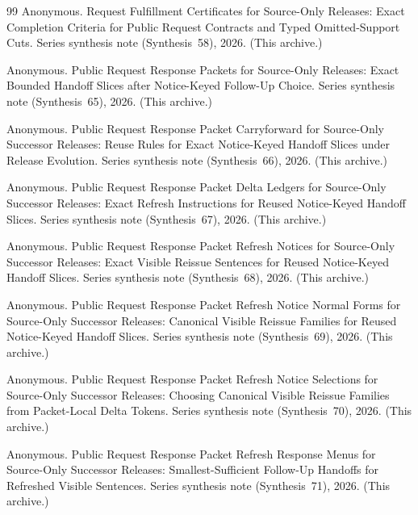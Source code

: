 \documentclass[11pt]{article}
\begin{document}
\begin{thebibliography}{99}
Anonymous.
\newblock Request Fulfillment Certificates for Source-Only Releases: Exact Completion Criteria for Public Request Contracts and Typed Omitted-Support Cuts.
\newblock Series synthesis note (Synthesis~58), 2026. (This archive.)



Anonymous.
\newblock Public Request Response Packets for Source-Only Releases: Exact Bounded Handoff Slices after Notice-Keyed Follow-Up Choice.
\newblock Series synthesis note (Synthesis~65), 2026. (This archive.)

Anonymous.
\newblock Public Request Response Packet Carryforward for Source-Only Successor Releases: Reuse Rules for Exact Notice-Keyed Handoff Slices under Release Evolution.
\newblock Series synthesis note (Synthesis~66), 2026. (This archive.)

Anonymous.
\newblock Public Request Response Packet Delta Ledgers for Source-Only Successor Releases: Exact Refresh Instructions for Reused Notice-Keyed Handoff Slices.
\newblock Series synthesis note (Synthesis~67), 2026. (This archive.)

Anonymous.
\newblock Public Request Response Packet Refresh Notices for Source-Only Successor Releases: Exact Visible Reissue Sentences for Reused Notice-Keyed Handoff Slices.
\newblock Series synthesis note (Synthesis~68), 2026. (This archive.)

Anonymous.
\newblock Public Request Response Packet Refresh Notice Normal Forms for Source-Only Successor Releases: Canonical Visible Reissue Families for Reused Notice-Keyed Handoff Slices.
\newblock Series synthesis note (Synthesis~69), 2026. (This archive.)

Anonymous.
\newblock Public Request Response Packet Refresh Notice Selections for Source-Only Successor Releases: Choosing Canonical Visible Reissue Families from Packet-Local Delta Tokens.
\newblock Series synthesis note (Synthesis~70), 2026. (This archive.)

Anonymous.
\newblock Public Request Response Packet Refresh Response Menus for Source-Only Successor Releases: Smallest-Sufficient Follow-Up Handoffs for Refreshed Visible Sentences.
\newblock Series synthesis note (Synthesis~71), 2026. (This archive.)



\end{thebibliography}
\end{document}
